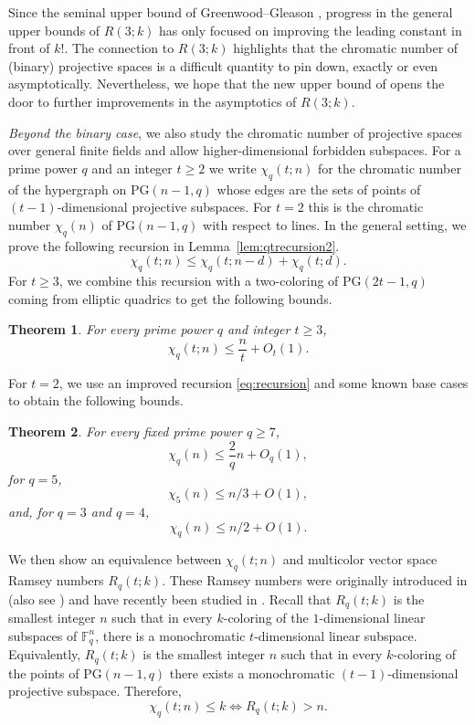 \documentclass[11pt]{article}
\theoremstyle{plain}
\newtheorem{theorem}{Theorem}
\newcommand{\PG}{\mathrm{PG}}
\begin{document}
Since the seminal upper bound of Greenwood–Gleason \cite{GreenwoodGleason1955}, progress in the general upper bounds of $R(3;k)$ has only focused on improving the leading constant in front of $k!$.
The connection to $R(3;k)$ highlights that the chromatic number of (binary) projective spaces is a difficult quantity to pin down, exactly or even asymptotically.
Nevertheless, we hope that the new upper bound of  opens the door to further improvements in the asymptotics of $R(3; k)$. 

\textit{Beyond the binary case}, we also study the chromatic number of projective spaces over general finite fields and allow higher-dimensional forbidden subspaces.
For a prime power $q$ and an integer $t\ge 2$ we write $\chi_q(t;n)$ for the chromatic number of the hypergraph on $\PG(n-1,q)$ whose edges are the sets of points of $(t-1)$-dimensional projective subspaces.
For $t=2$ this is the chromatic number $\chi_q(n)$ of $\PG(n-1,q)$ with respect to lines.
In the general setting, we prove the following recursion in Lemma~\ref{lem:qtrecursion2}.
\[
    \chi_q(t; n) \leq \chi_q(t; n - d) + \chi_q(t; d).
\]
For $t\ge3$, we combine this recursion with a two-coloring of $\PG(2t-1,q)$ coming from elliptic quadrics to get the following bounds.
\begin{theorem}\label{thm:chiq-upper-bound_t}
For every prime power $q$ and integer $t\ge3$,
\[
    \chi_q(t;n) \le \frac{n}{t}+O_t(1).
\]
\end{theorem}

For $t=2$, we use an improved recursion \eqref{eq:recursion} and some known base cases to obtain the following bounds.
\begin{theorem}\label{thm:chiq-upper-bound}
For every fixed prime power $q\ge 7$, 
\[
\chi_q(n)\le \frac{2}{q}n+O_q(1),
\]
for $q=5$, 
\[
\chi_5(n)\le n/3+O(1),
\]
and, for $q=3$ and $q=4$, 
\[
\chi_q(n)\le n/2+O(1).
\]
\end{theorem}

We then show an equivalence between $\chi_q(t;n)$ and multicolor vector space Ramsey numbers $R_q(t;k)$.
These Ramsey numbers were originally introduced in \cite{GrahamLeebRothschild1972} (also see \cite{Spencer1979}) and have recently been studied in \cite{Frederickson2023, Hunter2025}.
Recall that $R_q(t;k)$ is the smallest integer $n$ such that in every $k$-coloring of the $1$-dimensional linear subspaces of $\mathbb{F}_q^n$, there is a monochromatic $t$-dimensional linear subspace.
Equivalently, $R_q(t;k)$ is the smallest integer $n$ such that in every $k$-coloring of the points of $\PG(n-1,q)$ there exists a monochromatic $(t-1)$-dimensional projective subspace.
Therefore, 
\[\chi_q(t; n) \leq k \iff R_q(t; k) > n.\]    
\end{document}
